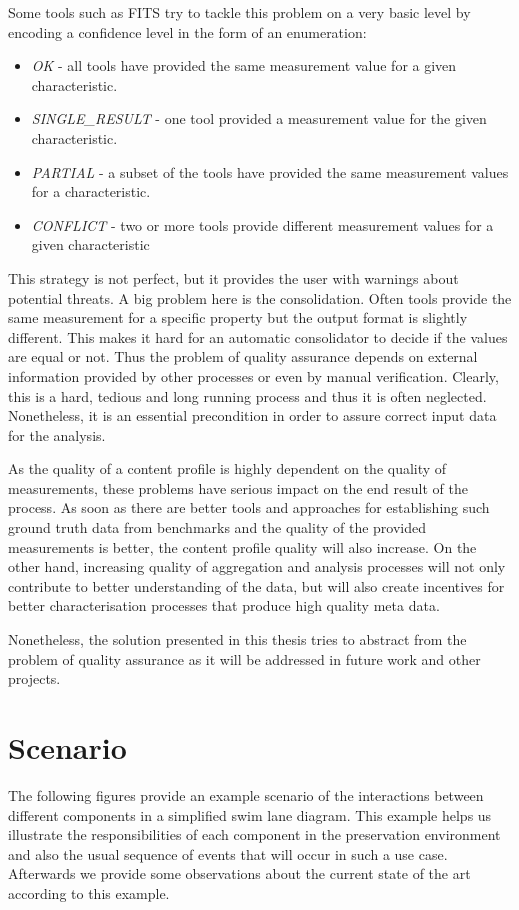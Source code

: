 Some tools such as FITS try to tackle this problem on a very basic level by encoding a confidence level in the form of an enumeration: 
\begin{itemize}
\item \textit{OK} - all tools have provided the same measurement value for a given characteristic.
\item \textit{SINGLE\_RESULT} - one tool provided a measurement value for the given characteristic.
\item \textit{PARTIAL} - a subset of the tools have provided the same measurement values for a characteristic.
\item \textit{CONFLICT} - two or more tools provide different measurement values for a given characteristic
\end{itemize}
This strategy is not perfect, but it provides the user with warnings about potential threats.
A big problem here is the consolidation. Often tools provide the same measurement for a specific property but the output format is slightly different. This makes it hard for an automatic consolidator to decide if the values are equal or not. Thus the problem of quality assurance depends on external information provided by other processes or even by manual verification. 
Clearly, this is a hard, tedious and long running process and thus it is often neglected.
Nonetheless, it is an essential precondition in order to assure correct input data for the analysis.

As the quality of a content profile is highly dependent on the quality of measurements, these problems have serious impact on the end result of the process. As soon as there are better tools and approaches for establishing such ground truth data from benchmarks and the quality of the provided measurements is better, the content profile quality will also increase. On the other hand, increasing quality of aggregation and analysis processes will not only contribute to better understanding of the data, but will also create incentives for better characterisation processes that produce high quality meta data.

Nonetheless, the solution presented in this thesis tries to abstract from the problem of quality assurance as it will be addressed in future work and other projects.

\section{Scenario}
The following figures provide an example scenario of the interactions between different components in a simplified swim lane diagram. This example helps us illustrate the responsibilities of each component in the preservation environment and also the usual sequence of events that will occur in such a use case. Afterwards we provide some observations about the current state of the art according to this example.

